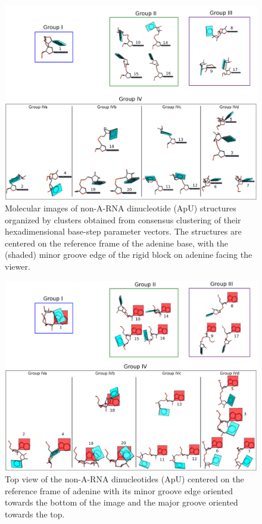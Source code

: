 \begin{figure}[htbp]
 \centering
\includegraphics[angle=90, scale=0.43]{Chapter2/collageb.png}
 \caption{Molecular images of  non-A-RNA dinucleotide (ApU) structures
   organized by  clusters obtained from consensus  clustering of their
   hexadimensional  base-step parameter  vectors.  The  structures are
   centered  on the  reference frame  of  the adenine  base, with  the
   (shaded) minor groove edge of the rigid block on adenine facing the
   viewer.}
 \label{fig:nonAclus}
\end{figure}

\begin{figure}
\centering
\includegraphics[angle=90, scale=0.48]{Chapter2/collage2.png}
\caption{Top view of the non-A-RNA dinucleotides (ApU) centered on the
  reference frame of adenine with its minor  groove edge oriented
  towards  the bottom  of  the  image and  the  major groove  oriented
  towards the top.}
\label{fig:steps2}
\end{figure}

